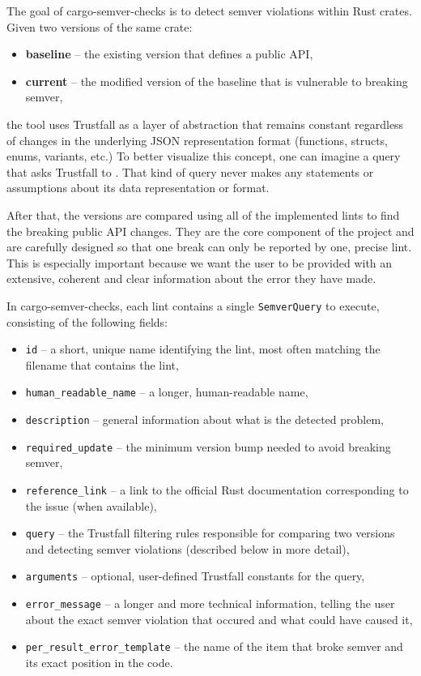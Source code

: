 \documentclass[licencjacka,en]{pracamgr}
\begin{document}
The goal of cargo-semver-checks is to detect semver violations within Rust crates. Given two
versions of the same crate:
\begin{itemize}
	\item \textbf{baseline} -- the existing version that defines a public API,
	\item \textbf{current} -- the modified version of the baseline that is vulnerable to
		breaking semver,
\end{itemize}
the tool uses Trustfall as a layer of abstraction that remains constant regardless of changes in
the underlying JSON representation format (functions, structs, enums, variants, etc.) To better
visualize this concept, one can imagine a query that asks Trustfall to . That kind of query
never makes any statements or assumptions about its data representation or format.

After that, the versions are compared using all of the implemented lints to find the breaking
public API changes. They are the core component of the project and are carefully designed so that
one break can only be reported by one, precise lint. This is especially important because we want
the user to be provided with an extensive, coherent and clear information about the error they
have made.

In cargo-semver-checks, each lint contains a single \texttt{SemverQuery} to execute, consisting of
the following fields:

\begin{itemize}
	\item \texttt{id} -- a short, unique name identifying the lint, most often matching the
		filename that contains the lint,
	\item \texttt{human\_readable\_name} -- a longer, human-readable name,
	\item \texttt{description} -- general information about what is the detected problem,
	\item \texttt{required\_update} -- the minimum version bump needed to avoid breaking semver,
	\item \texttt{reference\_link} -- a link to the official Rust documentation corresponding to
		the issue (when available),
	\item \texttt{query} -- the Trustfall filtering rules responsible for comparing two versions and
		detecting semver violations (described below in more detail),
	\item \texttt{arguments} -- optional, user-defined Trustfall constants for the query,
	\item \texttt{error\_message} -- a longer and more technical information, telling the user
	    about the exact semver violation that occured and what could have caused it,
	\item \texttt{per\_result\_error\_template} -- the name of the item that broke semver and
	    its exact position in the code.
\end{itemize}
\end{document}
